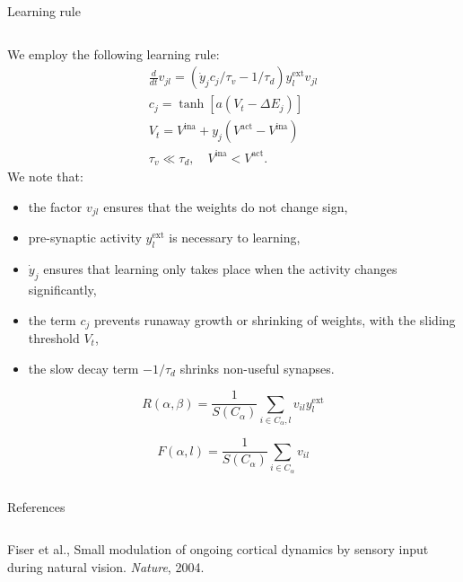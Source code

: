 \documentclass[final,hyperref={pdfpagelabels=false}]{beamer}
\begin{document}
\begin{frame}
\begin{columns}
\begin{column}{.64\textwidth}
\begin{minipage}[T]{.95\textwidth}
{\begin{block}{Learning rule}
\begin{columns}
\begin{column}[T]{.5\textwidth}
								We employ the following learning rule:
								\begin{gather*}
									\frac{d}{dt} v_{jl} = \left(\dot{y}_j c_j / \tau_v  - 1 / \tau_d\right) y_l^{\text{ext}} v_{jl}  \\
									c_j = \tanh{\left[a \left(V_t - \Delta E_j \right)\right]} \\
									 V_t = V^{\text{ina}} + y_j \left(V^{\text{act}} - V^{\text{ina}}\right)\\
									\tau_v \ll \tau_d, \quad V^{\text{ina}} < V^{\text{act}}.	
								\end{gather*}
								We note that:
								\begin{itemize}
									\item the factor $v_{jl}$ ensures that the weights do not change sign,
									\item pre-synaptic activity $y_l^{\text{ext}}$ is necessary to learning,
									\item $\dot{y}_j$ ensures that learning only takes place when the activity changes significantly,
									\item the term $c_j$ prevents runaway growth or shrinking of weights, with the sliding threshold $V_t$,
									\item the slow decay term $-1/\tau_d$ shrinks non-useful synapses.
								\end{itemize}
								
								\begin{equation}
									R(\alpha, \beta) = \frac{1}{S(C_\alpha)} \sum_{i\in C_\alpha, l} v_{il} y_l^{\text{ext}}
								\end{equation}
								
								\begin{equation}
									F(\alpha, l) = \frac{1}{S(C_\alpha)} \sum_{i\in C_\alpha} v_{il}
								\end{equation}
							\end{column}
						\end{columns}
							
						
					\end{block}
						

					\vfill
					\begin{refblock}{References}
						\begin{columns}
						 \begin{thebibliography}{1}
								\begin{column}[T]{.46\textwidth}
										Fiser et al., Small modulation of ongoing cortical dynamics by sensory input during natural vision.
										\emph{Nature}, 2004.
										

\end{column}
\end{thebibliography}
\end{columns}
\end{refblock}}
\end{minipage}
\end{column}
\end{columns}
\end{frame}
\end{document}
